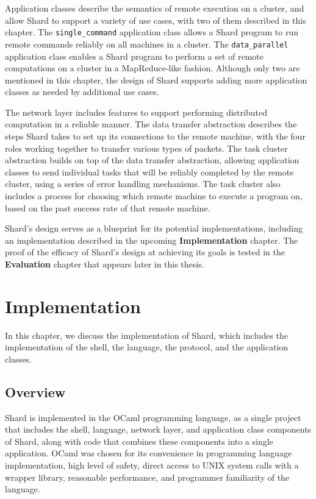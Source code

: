\documentclass[oneside]{report}
\begin{document}
Application classes describe the semantics of remote execution on a cluster, and allow Shard to support a variety of use cases, with two of them described in this chapter.
The \texttt{single\_command} application class allows a Shard program to run remote commands reliably on all machines in a cluster.
The \texttt{data\_parallel} application class enables a Shard program to perform a set of remote computations on a cluster in a MapReduce-like fashion.
Although only two are mentioned in this chapter, the design of Shard supports adding more application classes as needed by additional use cases.

The network layer includes features to support performing distributed computation in a reliable manner.
The data transfer abstraction describes the steps Shard takes to set up its connections to the remote machine, with the four roles working together to transfer various types of packets.
The task cluster abstraction builds on top of the data transfer abstraction, allowing application classes to send individual tasks that will be reliably completed by the remote cluster, using a series of error handling mechanisms.
The task cluster also includes a process for choosing which remote machine to execute a program on, based on the past success rate of that remote machine.

Shard's design serves as a blueprint for its potential implementations, including an implementation described in the upcoming \textbf{Implementation} chapter.
The proof of the efficacy of Shard's design at achieving its goals is tested in the \textbf{Evaluation} chapter that appears later in this thesis.


\chapter{Implementation}

In this chapter, we discuss the implementation of Shard, which includes the implementation of the shell, the language, the protocol, and the application classes.

\section{Overview}

Shard is implemented in the OCaml programming language, as a single project that includes the shell, language, network layer, and application class components of Shard, along with code that combines these components into a single application.
OCaml was chosen for its convenience in programming language implementation, high level of safety, direct access to UNIX system calls with a wrapper library, reasonable performance, and programmer familiarity of the language.
\end{document}
